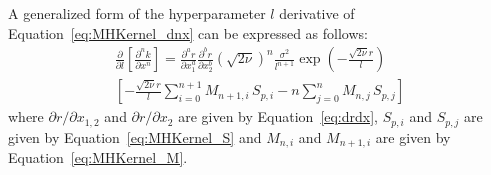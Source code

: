 \documentclass{article}
\begin{document}
\begin{comment}
\begin{multline}
\label{eq:MHKernel_dl_d1x1}
	\frac{\partial}{\partial l} \left[\frac{\partial k\!\left(x_1,x_2\right)}{\partial x_1}\right] = - \frac{\partial r}{\partial x_1} \frac{\sqrt{2 \nu}}{l^2} \, \sigma^2 \exp{\left(-\frac{\sqrt{2 \nu} r}{l}\right)} \\
	\left[-\left(S_0 - 2 S_1\right) + \frac{\sqrt{2 \nu} r}{l} \left(S_0 - 4 S_1 + 4 S_2\right)\right]
\end{multline}
\begin{multline}
\label{eq:MHKernel_dl_d1x2}
	\frac{\partial}{\partial l} \left[\frac{\partial k\!\left(x_1,x_2\right)}{\partial x_2}\right] = - \frac{\partial r}{\partial x_2} \frac{\sqrt{2 \nu}}{l^2} \, \sigma^2 \exp{\left(-\frac{\sqrt{2 \nu} r}{l}\right)} \\
	\left[-\left(S_0 - 2 S_1\right) + \frac{\sqrt{2 \nu} r}{l} \left(S_0 - 4 S_1 + 4 S_2\right)\right]
\end{multline}

\begin{multline}
\label{eq:MHKernel_dl_d2x}
	\frac{\partial}{\partial l} \left[\frac{\partial^2 k\!\left(x_1,x_2\right)}{\partial x_1 \partial x_2}\right] = \frac{\partial r}{\partial x_1} \frac{\partial r}{\partial x_2} \frac{2 \nu}{l^3} \, \sigma^2 \exp{\left(-\frac{\sqrt{2 \nu} r}{l}\right)} \\
	\left[-2 \left(S_0 - 4 S_1 + 4 S_2\right) + \frac{\sqrt{2 \nu} r}{l} \left(S_0 - 6 S_1 + 12 S_2 - 8 S_3\right)\right]
\end{multline}
\end{comment}

A generalized form of the hyperparameter $l$ derivative of Equation~\eqref{eq:MHKernel_dnx} can be expressed as follows:
\begin{multline}
\label{eq:MHKernel_dl_dnx}
	\frac{\partial}{\partial l} \left[\frac{\partial^n k}{\partial x^n}\right] = \frac{\partial^a r}{\partial x_1^a} \frac{\partial^b r}{\partial x_2^b} \left(\sqrt{2 \nu}\right)^n \frac{\sigma^2}{l^{n+1}} \exp{\left(-\frac{\sqrt{2 \nu} r}{l}\right)} \\
	\left[-\frac{\sqrt{2 \nu} r}{l} \sum_{i=0}^{n+1} M_{n+1,i} \, S_{p,i} - n \sum_{j=0}^{n} M_{n,j} \, S_{p,j}\right]
\end{multline}
where $\partial r/\partial x_{1,2}$ and $\partial r/\partial x_2$ are given by Equation~\eqref{eq:drdx}, $S_{p,i}$ and $S_{p,j}$ are given by Equation~\eqref{eq:MHKernel_S} and $M_{n,i}$ and $M_{n+1,i}$ are given by Equation~\eqref{eq:MHKernel_M}.
\end{document}
